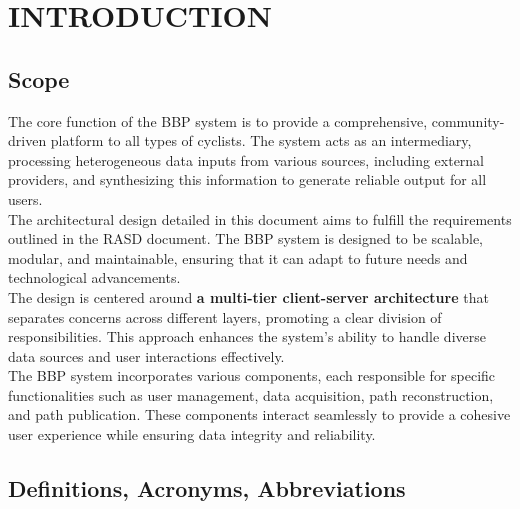 \section{INTRODUCTION}
\subsection{Scope}
The core function of the BBP system is to provide a comprehensive, community-driven platform to all types of cyclists. The system acts as an intermediary,
processing heterogeneous data inputs from various sources, including external
providers, and synthesizing this information to generate reliable output for all
users. \\
\noindent The architectural design detailed in this document aims to fulfill the requirements outlined in the RASD document. The BBP system is designed to be scalable, modular, and maintainable, ensuring that it can adapt to future needs and technological advancements. \\
\noindent The design is centered around \textbf{a multi-tier client-server architecture} that separates concerns across different layers, promoting a clear division of responsibilities. This approach enhances the system's ability to handle diverse data sources and user interactions effectively. \\
\noindent The BBP system incorporates various components, each responsible for specific functionalities such as user management, data acquisition, path reconstruction, and path publication. These components interact seamlessly to provide a cohesive user experience while ensuring data integrity and reliability. \\

\subsection{Definitions, Acronyms, Abbreviations}
